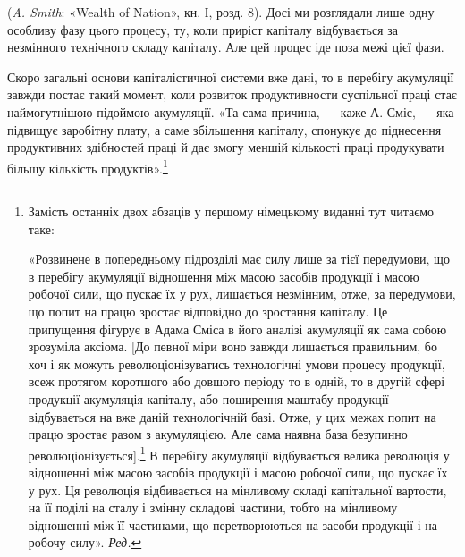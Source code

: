 \parcont{}  %
(\emph{A. Smith}: «Wealth of Nation», кн. І, розд. 8). Досі ми розглядали
лише одну особливу фазу цього процесу, ту, коли приріст капіталу
відбувається за незмінного технічного складу капіталу.
Але цей процес іде поза межі цієї фази.

Скоро загальні основи капіталістичної системи вже дані, то
в перебігу акумуляції завжди постає такий момент, коли розвиток
продуктивности суспільної праці стає наймогутнішою
підоймою акумуляції. «Та сама причина, — каже А. Сміс, —
яка підвищує заробітну плату, а саме збільшення капіталу,
спонукує до піднесення продуктивних здібностей праці й дає
змогу меншій кількості праці продукувати більшу кількість
продуктів».\footnote*{
Замість останніх двох абзаців у першому німецькому виданні
тут читаємо таке:

«Розвинене в попередньому підрозділі має силу лише за тієї передумови,
що в перебігу акумуляції відношення між масою засобів продукції і
масою робочої сили, що пускає їх у рух, лишається незмінним, отже,
за передумови, що попит на працю зростає відповідно до зростання капіталу.
Це припущення фігурує в Адама Сміса в його аналізі акумуляції
як сама собою зрозуміла аксіома. [До певної міри воно завжди лишається
правильним, бо хоч і як можуть революціонізуватись технологічні умови
процесу продукції, всеж протягом коротшого або довшого періоду то в одній,
то в другій сфері продукції акумуляція капіталу, або поширення маштабу
продукції відбувається на вже даній технологічній базі. Отже, у цих межах
попит на працю зростає разом з акумуляцією. Але сама наявна база
безупинно революціонізується].\footnote*{
Заведене у прямі дужки Маркс з другого видання вилучив. Дальшу
фразу він тут починає так: «Але Адам Сміс недобачає, що в перебігу
акумуляції і т. д\dots{}». \emph{Ред.}
}
В перебігу акумуляції відбувається
велика революція у відношенні між масою засобів продукції і масою робочої
сили, що пускає їх у рух. Ця революція відбивається на мінливому
складі капітальної вартости, на її поділі на сталу і змінну складові частини,
тобто на мінливому відношенні між її частинами, що перетворюються
на засоби продукції і на робочу силу». \emph{Ред.}
}

